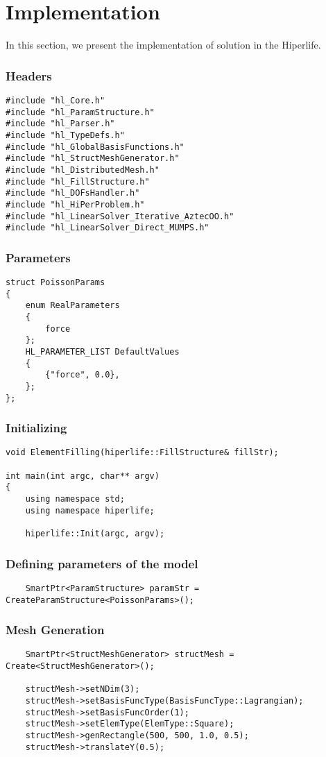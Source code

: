 \documentclass[]{article}
\begin{document}
\section{Implementation} \label{sec: imp}
In this section, we present the implementation of solution in the Hiperlife.
\subsubsection{Headers} \label{sec: hdr}
\begin{lstlisting}
#include "hl_Core.h"
#include "hl_ParamStructure.h"
#include "hl_Parser.h"
#include "hl_TypeDefs.h"
#include "hl_GlobalBasisFunctions.h"
#include "hl_StructMeshGenerator.h"
#include "hl_DistributedMesh.h"
#include "hl_FillStructure.h"
#include "hl_DOFsHandler.h"
#include "hl_HiPerProblem.h"
#include "hl_LinearSolver_Iterative_AztecOO.h"
#include "hl_LinearSolver_Direct_MUMPS.h"
\end{lstlisting}
	
\subsubsection{Parameters} \label{sec: ppr}
\begin{lstlisting}
struct PoissonParams
{
	enum RealParameters
	{
		force
	};	
	HL_PARAMETER_LIST DefaultValues
	{
		{"force", 0.0},
	};
};
\end{lstlisting}

\subsubsection{Initializing} \label{sec: main}
\begin{lstlisting}
void ElementFilling(hiperlife::FillStructure& fillStr);
	
int main(int argc, char** argv)
{
	using namespace std;
	using namespace hiperlife;
			
	hiperlife::Init(argc, argv);
\end{lstlisting}

\subsubsection{Defining parameters of the model} \label{sec: Pstr}
\begin{lstlisting}
	SmartPtr<ParamStructure> paramStr = CreateParamStructure<PoissonParams>();
\end{lstlisting}

\subsubsection{Mesh Generation} \label{sec: mshG}
\begin{lstlisting}
	SmartPtr<StructMeshGenerator> structMesh = Create<StructMeshGenerator>();
	
	structMesh->setNDim(3);
	structMesh->setBasisFuncType(BasisFuncType::Lagrangian);
	structMesh->setBasisFuncOrder(1);
	structMesh->setElemType(ElemType::Square);
	structMesh->genRectangle(500, 500, 1.0, 0.5);
	structMesh->translateY(0.5);
\end{lstlisting}
\end{document}

